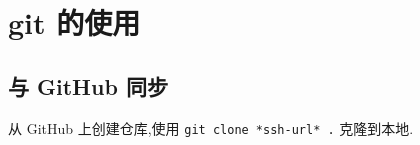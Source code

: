 
\usepackage{../../lectures_preamble}


    \section{git 的使用}
    \subsection{与 GitHub 同步}
        从 GitHub 上创建仓库,使用 \texttt{git clone *ssh-url* .} 克隆到本地.

